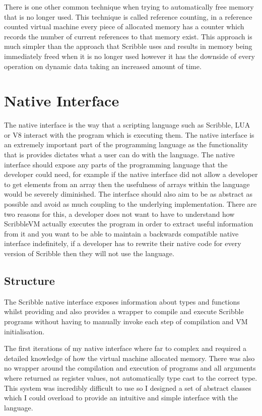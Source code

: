 \documentclass[]{final_report}
\begin{document}
There is one other common technique when trying to automatically free memory that is no longer used. This technique is called reference counting, in a reference counted virtual machine every piece of allocated memory has a counter which records the number of current references to that memory exist. This approach is much simpler than the approach that Scribble uses and results in memory being immediately freed when it is no longer used however it has the downside of every operation on dynamic data taking an increased amount of time.

\chapter{Native Interface}

The native interface is the way that a scripting language such as Scribble, LUA or V8 interact with the program which is executing them. The native interface is an extremely important part of the programming language as the functionality that is provides dictates what a user can do with the language. The native interface should expose any parts of the programming language that the developer could need, for example if the native interface did not allow a developer to get elements from an array then the usefulness of arrays within the language would be severely diminished. The interface should also aim to be as abstract as possible and avoid as much coupling to the underlying implementation. There are two reasons for this, a developer does not want to have to understand how ScribbleVM actually executes the program in order to extract useful information from it and you want to be able to maintain a backwards compatible native interface indefinitely, if a developer has to rewrite their native code for every version of Scribble then they will not use the language.

\section{Structure}

The Scribble native interface exposes information about types and functions whilst providing and also provides a wrapper to compile and execute Scribble programs without having to manually invoke each step of compilation and VM initialisation.

The first iterations of my native interface where far to complex and required a detailed knowledge of how the virtual machine allocated memory. There was also no wrapper around the compilation and execution of programs and all arguments where returned as register values, not automatically type cast to the correct type. This system was incredibly difficult to use so I designed a set of abstract classes which I could overload to provide an intuitive and simple interface with the language.
\end{document}
